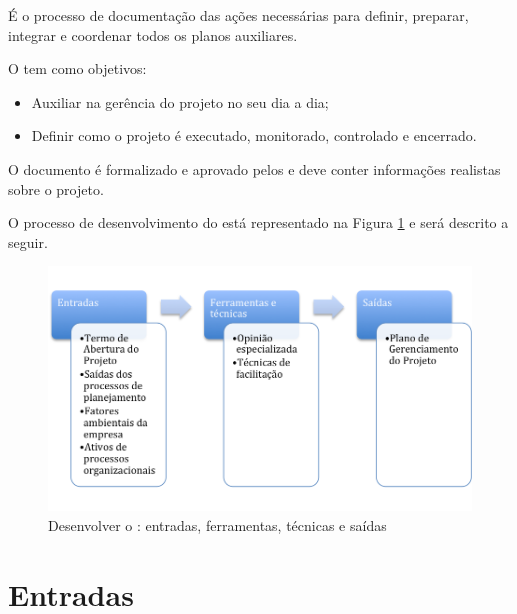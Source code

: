 \label{sec:planproj}

É o processo de documentação das ações necessárias para definir, preparar, integrar e coordenar todos os planos auxiliares.

O \planproj tem como objetivos:

\begin{itemize}
	
	\item Auxiliar na gerência do projeto no seu dia a dia;
	
	\item Definir como o projeto é executado, monitorado, controlado e encerrado.
	
\end{itemize}

O documento é formalizado e aprovado pelos \stake e deve conter informações realistas sobre o projeto.

O processo de desenvolvimento do \planproj está representado na Figura \ref{fig:plano:ger:projeto:etfs} e será descrito a seguir.

\begin{figure}[!h]
	\centering
	\includegraphics[scale=0.75]{Figuras/plano_ger_projeto_etfs.png}
	\caption{Desenvolver o \planproj: entradas, ferramentas, técnicas e saídas}
	\label{fig:plano:ger:projeto:etfs}
\end{figure}

\section{Entradas}

